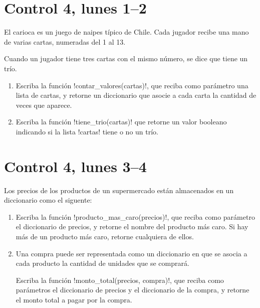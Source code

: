 \documentclass[12pt,spanish,a5paper,landscape]{article}
\begin{document}
  \pagestyle{empty}
  \thispagestyle{empty}

  \part*{Control 4, lunes 1--2}
  \newpage

  El carioca es un juego de naipes típico de Chile.
  Cada jugador recibe una mano de varias cartas,
  numeradas del 1 al 13.

  Cuando un jugador tiene tres cartas con el mismo número,
  se dice que tiene un trío.

  \begin{enumerate}
    \item
      Escriba la función \li!contar_valores(cartas)!,
      que reciba como parámetro una lista de cartas,
      y retorne un diccionario que asocie a cada carta
      la cantidad de veces que aparece.
      

    \item
      Escriba la función \li!tiene_trio(cartas)!
      que retorne un valor booleano
      indicando si la lista \li!cartas! tiene o no un trío.
      

  \end{enumerate}
  \newpage

  \part*{Control 4, lunes 3--4}
  \newpage

  Los precios de los productos de un supermercado
  están almacenados en un diccionario como el siguente:
  

  \begin{enumerate}
    \item
      Escriba la función \li!producto_mas_caro(precios)!,
      que reciba como parámetro el diccionario de precios,
      y retorne el nombre del producto más caro.
      Si hay más de un producto más caro,
      retorne cualquiera de ellos.
      

    \item
      Una compra puede ser representada como un diccionario
      en que se asocia a cada producto
      la cantidad de unidades que se comprará.

      Escriba la función \li!monto_total(precios, compra)!,
      que reciba como parámetros el diccionario de precios
      y el diccionario de la compra,
      y retorne el monto total a pagar por la compra.
      

  \end{enumerate}
  \newpage
\end{document}
